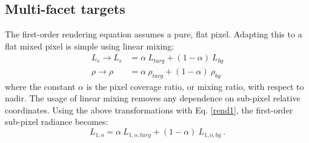 \documentclass{article}
\numberwithin{equation}{section}
\begin{document}
    \subsection{Multi-facet targets}

        The first-order rendering equation assumes a pure, flat pixel.
        Adapting this to a flat mixed pixel is simple using linear mixing:
        \begin{align*}
            L_e \longrightarrow L_e &= \alpha\ L_{targ} + (1 - \alpha)\ L_{bg} \\
            \rho \longrightarrow \rho &= \alpha\ \rho_{targ} + (1 - \alpha)\ \rho_{bg}
        \end{align*}
        where the constant $\alpha$ is the pixel coverage ratio, or mixing ratio, with respect to nadir.
        The usage of linear mixing removes any dependence on sub-pixel relative coordinates.
        Using the above transformations with Eq. \ref{rend1}, the first-order sub-pixel radiance becomes:
        $$
            L_{1, o} = \alpha\ L_{1, o, targ} + (1 - \alpha)\ L_{1, o, bg}\ .
        $$
\end{document}
